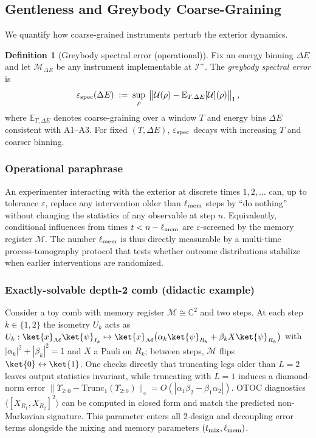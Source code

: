 \documentclass[aps,prd,preprint,onecolumn,superscriptaddress,nofootinbib,longbibliography,floatfix,11pt,showpacs,showkeys]{revtex4-2}
\theoremstyle{plain}
\theoremstyle{definition}
\newtheorem{definition}[theorem]{Definition}
\theoremstyle{remark}
\begin{document}
\subsection{Gentleness and Greybody Coarse-Graining}

\label{sec:gentleness}
We quantify how coarse-grained instruments perturb the exterior dynamics.
\begin{definition}[Greybody spectral error (operational)]
Fix an energy binning $\Delta E$ and let $\mathcal{M}_{\Delta E}$ be any instrument implementable at $\mathscr{I}^+$. The \emph{greybody spectral error} is
\begin{equation*}
\varepsilon_{\rm spec}(\Delta E) \;:=\; \sup_{\rho}\; \big\| \mathcal{U}(\rho) - \mathbb{E}_{T,\Delta E}[\mathcal{U}](\rho) \big\|_1\,,
\end{equation*}
where $\mathbb{E}_{T,\Delta E}$ denotes coarse-graining over a window $T$ and energy bins $\Delta E$ consistent with A1--A3. For fixed $(T,\Delta E)$, $\varepsilon_{\rm spec}$ decays with increasing $T$ and coarser binning.
\end{definition}

\subsubsection{Operational paraphrase}
An experimenter interacting with the exterior at discrete times $1,2,\dots$ can, up to tolerance $\varepsilon$,
replace any intervention older than $\ell_{\rm mem}$ steps by ``do nothing'' without changing the statistics
of any observable at step $n$. Equivalently, conditional influences from times $t<n-\ell_{\rm mem}$ are
$\varepsilon$-screened by the memory register $\mathcal{M}$. The number $\ell_{\rm mem}$ is thus directly
measurable by a multi-time process-tomography protocol that tests whether outcome distributions stabilize
when earlier interventions are randomized.

\subsubsection*{Exactly-solvable depth-2 comb (didactic example)}
\label{sssec:depth2-didactic}
Consider a toy comb with memory register $\mathcal{M}\cong\mathbb{C}^2$ and two steps.
At each step $k\in\{1,2\}$ the isometry $U_k$ acts as
$U_k:\ket{x}_{\mathcal{M}}\ket{\psi}_{I_k}\mapsto \ket{x}_{\mathcal{M}}\big(\alpha_k \ket{\psi}_{R_k}+\beta_k X\ket{\psi}_{R_k}\big)$
with $|\alpha_k|^2+|\beta_k|^2=1$ and $X$ a Pauli on $R_k$; between steps, $\mathcal{M}$ flips $\ket{0}\leftrightarrow\ket{1}$.
One checks directly that truncating legs older than $L{=}2$ leaves output statistics invariant, while truncating with $L{=}1$
induces a diamond-norm error $\|\Upsilon_{2{:}0}-\mathrm{Trunc}_1(\Upsilon_{2{:}0})\|_\diamond = O(|\alpha_1\beta_2-\beta_1\alpha_2|)$.
OTOC diagnostics $\langle [X_{R_1},X_{R_2}]^2\rangle$ can be computed in closed form and match the predicted non-Markovian signature.
This parameter enters all 2-design and decoupling error terms alongside the mixing and memory parameters $(t_{\rm mix},\ell_{\rm mem})$.
\end{document}
